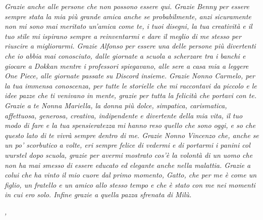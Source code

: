 \noindent \textit{
                  Grazie anche alle persone che non possono essere qui. Grazie Benny per essere sempre stata la mia più grande amica anche se probabilmente, anzi sicuramente non mi sono mai meritato un'amica come te, i tuoi disegni, la tua creatività e il tuo stile mi ispirano sempre a reinventarmi e dare il meglio di me stesso per riuscire a migliorarmi. Grazie Alfonso per essere una delle persone più divertenti che io abbia mai conosciuto, dalle giornate a scuola a scherzare tra i banchi e giocare a Dokkan mentre i professori spiegavano, alle sere a casa mia a leggere One Piece, alle giornate passate su Discord insieme.
                  Grazie Nonno Carmelo, per la tua immensa conoscenza, per tutte le storielle che mi raccontavi da piccolo e le idee pazze che ti venivano in mente, grazie per tutta la felicità che portavi con te. Grazie a te Nonna Mariella, la donna più dolce, simpatica, carismatica, affettuosa, generosa, creativa, indipendente e divertente della mia vita, il tuo modo di fare e la tua spensieratezza mi hanno reso quello che sono oggi, e so che questo lato di te vivrà sempre dentro di me. Grazie Nonno Vincenzo che, anche se un po' scorbutico a volte, eri sempre felice di vedermi e di portarmi i panini col wurstel dopo scuola, grazie per avermi mostrato cos'è la volontà di un uomo che non ha mai smesso di essere educato ed elegante anche nella malattia.
                  Grazie a colui che ha vinto il mio cuore dal primo momento, Gatto, che per me è come un figlio, un fratello e un amico allo stesso tempo e che è stato con me nei momenti in cui ero solo. Infine grazie a quella pazza sfrenata di Milù.}\\
\bigskip

\noindent\textit{\myLocation, \myTime}
\hfill \myName

\endgroup

